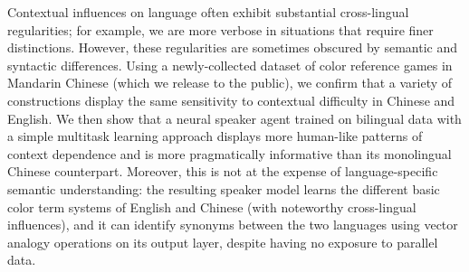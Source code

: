 Contextual influences on language often exhibit substantial cross-lingual regularities; for example, we are more verbose in situations that require finer distinctions. However, these regularities are sometimes obscured by semantic and syntactic differences. Using a newly-collected dataset of color reference games in Mandarin Chinese (which we release to the public), we confirm that a variety of constructions display the same sensitivity to contextual difficulty in Chinese and English. We then show that a neural speaker agent trained on bilingual data with a simple multitask learning approach displays more human-like patterns of context dependence and is more pragmatically informative than its monolingual Chinese counterpart. Moreover, this is not at the expense of language-specific semantic understanding: the resulting speaker model learns the different basic color term systems of English and Chinese (with noteworthy cross-lingual influences), and it can identify synonyms between the two languages using vector analogy operations on its output layer, despite having no exposure to parallel data.
